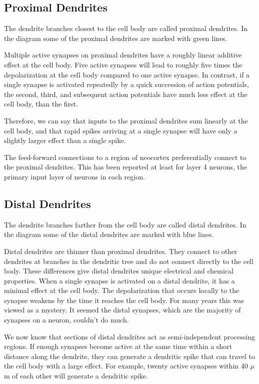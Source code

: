 \documentclass{report}
\begin{document}
\subsection*{Proximal Dendrites}
The dendrite branches closest to the cell body are called proximal
dendrites. In the diagram some of the proximal dendrites are marked
with green lines.

Multiple active synapses on proximal dendrites have a roughly linear
additive effect at the cell body. Five active synapses will lead to
roughly five times the depolarization at the cell body compared to one
active synapse. In contrast, if a single synapse is activated
repeatedly by a quick succession of action potentials, the second,
third, and subsequent action potentials have much less effect at the
cell body, than the first.

Therefore, we can say that inputs to the proximal dendrites sum
linearly at the cell body, and that rapid spikes arriving at a single
synapse will have only a slightly larger effect than a single spike.

The feed-forward connections to a region of neocortex preferentially
connect to the proximal dendrites. This has been reported at least for
layer 4 neurons, the primary input layer of neurons in each region.

\subsection*{Distal Dendrites}
The dendrite branches farther from the cell body are called distal
dendrites. In the diagram some of the distal dendrites are marked with
blue lines.

Distal dendrites are thinner than proximal dendrites. They connect to
other dendrites at branches in the dendritic tree and do not connect
directly to the cell body. These differences give distal dendrites
unique electrical and chemical properties. When a single synapse is
activated on a distal dendrite, it has a minimal effect at the cell
body. The depolarization that occurs locally to the synapse weakens by
the time it reaches the cell body. For many years this was viewed as a
mystery. It seemed the distal synapses, which are the majority of
synapses on a neuron, couldn't do much.

We now know that sections of distal dendrites act as semi-independent
processing regions. If enough synapses become active at the same time
within a short distance along the dendrite, they can generate a
dendritic spike that can travel to the cell body with a large
effect. For example, twenty active synapses within 40 $\mu$m of each
other will generate a dendritic spike.
\end{document}
